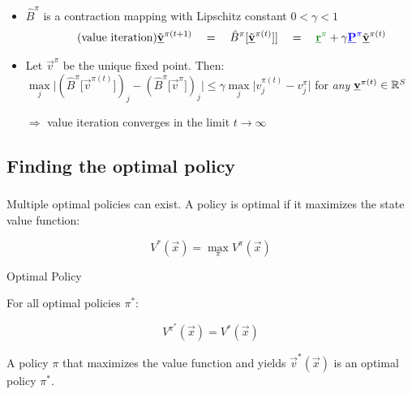 \begin{frame}
{\begin{itemize}
			\item $\hat B^\pi$ is a contraction mapping 
				with Lipschitz constant $0 < \gamma < 1$ 
			\vspace{2mm}
			\begin{align} \tag{value iteration}
				\tilde{\vec v}^{\pi(t+1)} 
				\quad=\quad \hat B^\pi\lbrack\tilde{\vec v}^{\pi(t)}]\rbrack
				\quad=\quad {\color{reward}\vec r^\pi} 
					+ \gamma {\color{trans}\vec P^\pi} \tilde{\vec v}^{\pi(t)}
			\end{align}
			\vspace{-2mm}
			\item Let $\vec v^\pi$ be the unique fixed point. Then:\\[10pt]
			\hspace{-3mm}$\max\limits_j \big|
				(\hat B^\pi \lbrack \vec v^{\pi(t)} \rbrack)_j - (\hat B^\pi \lbrack \vec v^{\pi} \rbrack)_j \big| 
				\leq \gamma \max\limits_j 
					\big|v^{\pi(t)}_j - v^\pi_j \big| $ 
				for {\em any} $\underline{\mathbf{v}}^{\pi(t)} \in \mathbb{R}^S$
			\vspace{3mm}
			\item[$\Rightarrow$] value iteration converges in the limit $t\to\infty$
				\vspace{1mm}
		\end{itemize} 
		\vspace{4mm}
	}
\end{frame}

\subsection{Finding the optimal policy}

\begin{frame}\frametitle{\subsecname}

Multiple optimal policies can exist. A policy is optimal if it maximizes the state value function:

\begin{equation}
V^{*}(\vec x) = \max_{\pi} V^{\pi} (\vec x)   
\end{equation}

\begin{block}{Optimal Policy}

For all optimal policies $\pi^{*}$:

\begin{equation}
    V^{\pi^{*}}(\vec x) = V^{*}(\vec x) 
\end{equation}

A policy $\pi$ that maximizes the value function and yields $\vec v^{*}(\vec x)$ is an optimal policy $\pi^{*}$.
    
\end{block}

    
\end{frame}


